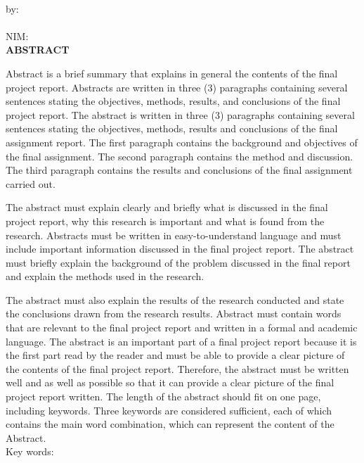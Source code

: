 
\clearpage
{}
{}
\begin{center}
    \textbf{\large{\judulen}}\\[0.5cm]
    by:\\
    \penulis\\
    NIM: \nim\\[2em]
    \textbf{ABSTRACT}\\[0.5cm]
\end{center}

Abstract is a brief summary that explains in general the contents of the final project report. Abstracts are written in three (3) paragraphs containing several sentences stating the objectives, methods, results, and conclusions of the final project report. The abstract is written in three (3) paragraphs containing several sentences stating the objectives, methods, results and conclusions of the final assignment report. The first paragraph contains the background and objectives of the final assignment. The second paragraph contains the method and discussion. The third paragraph contains the results and conclusions of the final assignment carried out.

The abstract must explain clearly and briefly what is discussed in the final project report, why this research is important and what is found from the research. Abstracts must be written in easy-to-understand language and must include important information discussed in the final project report. The abstract must briefly explain the background of the problem discussed in the final report and explain the methods used in the research.

The abstract must also explain the results of the research conducted and state the conclusions drawn from the research results. Abstract must contain words that are relevant to the final project report and written in a formal and academic language. The abstract is an important part of a final project report because it is the first part read by the reader and must be able to provide a clear picture of the contents of the final project report. Therefore, the abstract must be written well and as well as possible so that it can provide a clear picture of the final project report written. The length of the abstract should fit on one page, including keywords. Three keywords are considered sufficient, each of which contains the main word combination, which can represent the content of the Abstract.\\[0.6cm]

\noindent Key words: \keywords